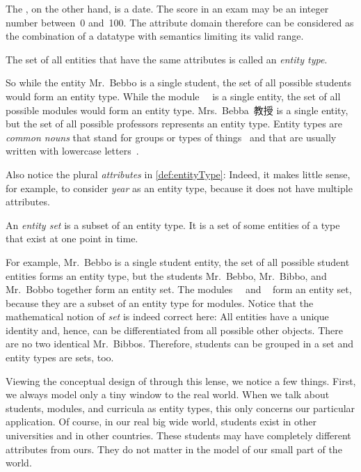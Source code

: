 The , on the other hand, is a date.
The score in an exam may be an integer number between~0 and~100.
The attribute domain therefore can be considered as the combination of a datatype with semantics limiting its valid range.%
%
\begin{definition}%
\label{def:entityType}%
The set of all entities that have the same attributes is called an \emph{entity type}.%
\end{definition}%
%
So while the entity Mr.~Bebbo is a single student, the set of all possible students would form an entity type.
While the module~~\cite{programmingWithPython} is a single entity, the set of all possible modules would form an entity type.
Mrs.~Bebba~教授 is a single entity, but the set of all possible professors represents an entity type.
Entity types are \emph{common nouns} that stand for groups or types of things~\cite{C1997ECAED} and that are usually written with lowercase letters~\cite{EOWM2025MWAMTD:CAPNWTDLWOGC}.

Also notice the plural \emph{attributes} in \cref{def:entityType}:%
%
Indeed, it makes little sense, for example, to consider \emph{year} as an entity type, because it does not have multiple attributes.%
%
\begin{definition}%
An \emph{entity set} is a subset of an entity type. %
It is a set of some entities of a type that exist at one point in time.%
\end{definition}%
%
For example, Mr.~Bebbo is a single student entity, the set of all possible student entities forms an entity type, but the students Mr.~Bebbo, Mr.~Bibbo, and Mr.~Bobbo together form an entity set.
The modules~~\cite{programmingWithPython} and ~\cite{databases} form an entity set, because they are a subset of an entity type for modules.
Notice that the mathematical notion of \emph{set} is indeed correct here:
All entities have a unique identity and, hence, can be differentiated from all possible other objects.
There are no two identical Mr.~Bibbos.
Therefore, students can be grouped in a set and entity types are sets, too.

Viewing the conceptual design of  through this lense, we notice a few things.
First, we always model only a tiny window to the real world.
When we talk about students, modules, and curricula as entity types, this only concerns our particular application.
Of course, in our real big wide world, students exist in other universities and in other countries.
These students may have completely different attributes from ours.
They do not matter in the model of our small part of the world.

